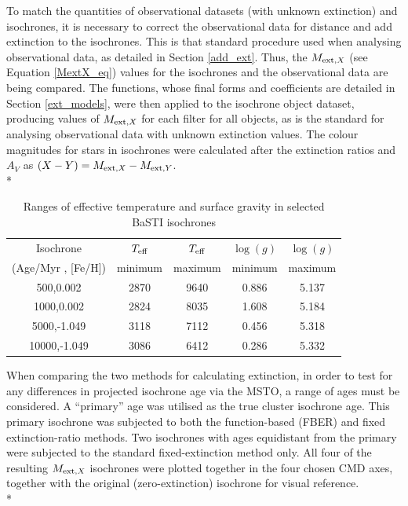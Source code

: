 \documentclass[12pt, a4paper]{report}
\begin{document}
To match the quantities of observational datasets (with unknown extinction) and isochrones, it is necessary to correct the observational data for distance and add extinction to the isochrones. This is that standard procedure used when analysing observational data, as detailed in Section \ref{add_ext}. Thus, the $M_{\textnormal{ext},X}$ (see Equation \ref{MextX_eq}) values for the isochrones and the observational data are being compared. The functions, whose final forms and coefficients are detailed in Section \ref{ext_models}, were then applied to the isochrone object dataset, producing values of $M_{\textnormal{ext},X}$ for each filter for all objects, as is the standard for analysing observational data with unknown extinction values. The colour magnitudes for stars in isochrones were calculated after the extinction ratios and $A_{V}$ as $(X-Y) = M_{\textnormal{ext},X} - M_{\textnormal{ext},Y}$.\\*

\begin{table}
\begin{center}
\begin{tabular}{ccccc}
\hline
Isochrone & $T_{\textnormal{eff}}$ & $T_{\textnormal{eff}}$ & $\log(g)$ & $\log(g)$ \\
(Age/Myr , [Fe/H]) & minimum & maximum & minimum & maximum \\
\hline
500,0.002 & 2870 & 9640 & 0.886 & 5.137 \\
1000,0.002 & 2824 & 8035 & 1.608 & 5.184 \\
5000,-1.049 & 3118 & 7112 & 0.456 & 5.318 \\
10000,-1.049 & 3086 & 6412 & 0.286 & 5.332 \\
\hline
\end{tabular}
\caption{Ranges of effective temperature and surface gravity in selected BaSTI isochrones}
\label{variable_ranges}
\end{center}
\end{table}

When comparing the two methods for calculating extinction, in order to test for any differences in projected isochrone age via the MSTO, a range of ages must be considered. A ``primary'' age was utilised as the true cluster isochrone age. This primary isochrone was subjected to both the function-based (FBER) and fixed extinction-ratio methods. Two isochrones with ages equidistant from the primary were subjected to the standard fixed-extinction method only. All four of the resulting $M_{\textnormal{ext},X}$ isochrones were plotted together in the four chosen CMD axes, together with the original (zero-extinction) isochrone for visual reference.\\*
\end{document}
